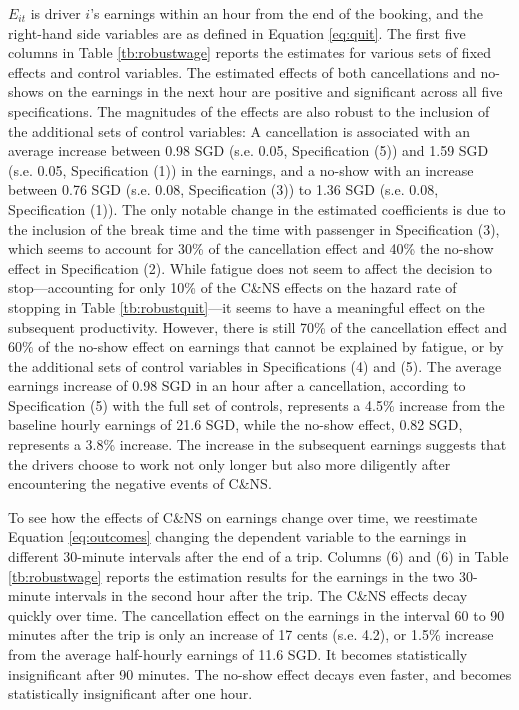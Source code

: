 \documentclass[reviewmode,AEJ]{AEA}
\begin{document}
$E_{it}$ is driver $i$'s earnings within an hour from the end of the booking, and the right-hand side variables are as defined in Equation \ref{eq:quit}. The first five columns in Table \ref{tb:robustwage} reports the estimates for various sets of fixed effects and control variables. The estimated effects of both cancellations and no-shows on the earnings in the next hour are positive and significant across all five specifications. The magnitudes of the effects are also robust to the inclusion of the additional sets of control variables: A cancellation is associated with an average increase between 0.98 SGD (s.e. 0.05, Specification (5)) and 1.59 SGD (s.e. 0.05, Specification (1)) in the earnings, and a no-show with an increase between 0.76 SGD (s.e. 0.08, Specification (3)) to 1.36 SGD (s.e. 0.08, Specification (1)). The only notable change in the estimated coefficients is due to the inclusion of the break time and the time with passenger in Specification (3), which seems to account for 30\% of the cancellation effect and 40\% the no-show effect in Specification (2). While fatigue does not seem to affect the decision to stop---accounting for only 10\% of the C\&NS effects on the hazard rate of stopping in Table \ref{tb:robustquit}---it seems to have a meaningful effect on the subsequent productivity. However, there is still 70\% of the cancellation effect and 60\% of the no-show effect on earnings that cannot be explained by fatigue, or by the additional sets of control variables in Specifications (4) and (5). The average earnings increase of 0.98 SGD in an hour after a cancellation, according to Specification (5) with the full set of controls, represents a 4.5\% increase from the baseline hourly earnings of 21.6 SGD, while the no-show effect, 0.82 SGD, represents a 3.8\% increase. The increase in the subsequent earnings suggests that the drivers choose to work not only  longer but also more diligently after encountering the negative events of C\&NS.


To see how the effects of C\&NS on earnings change over time, we reestimate Equation \eqref{eq:outcomes} changing the dependent variable to the earnings in different 30-minute intervals after the end of a trip. Columns (6) and (6) in Table \ref{tb:robustwage} reports the estimation results for the earnings in the two 30-minute intervals in the second hour after the trip. The C\&NS effects decay quickly over time. The cancellation effect on the earnings in the interval 60 to 90 minutes after the trip is only an increase of 17 cents (s.e. 4.2), or 1.5\% increase from the average half-hourly earnings of 11.6 SGD. It becomes statistically insignificant after 90 minutes. The no-show effect decays even faster, and becomes statistically insignificant after one hour.
\end{document}
